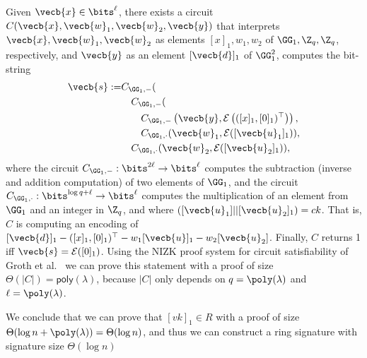 Given \(\vecb{x}\in\bits^\ell\), there exists a circuit \(C(\vecb{x},\vecb{w}_1,\vecb{w}_2,\vecb{y})\) that interprets \(\vecb{x},\vecb{w}_1,\vecb{w}_2\) as  elements \([x]_1,w_1,w_2\) of \(\GG_1,\Z_q,\Z_q\), respectively, and \(\vecb{y}\) as an element \([\vecb{d}]_1\) of \(\GG_1^2\), computes the bit-string
\begin{align*}
\vecb{s}:=
    &C_{\GG_1,-}(\\
        &\quad C_{\GG_1,-}(\\
            &\qquad C_{\GG_1,-}\left(
                \vecb{y},
                \mathcal{E}\left(
                        ({[x]_1},{[0]_1})^\top\right)\right),\\
            &\qquad C_{\GG_1,\cdot}(
                        \vecb{w}_1,
                        \mathcal{E}([\vecb{u}_1]_1)),\\
        &\quad C_{\GG_1,\cdot}(
                    \vecb{w}_2,
                    \mathcal{E}([\vecb{u}_2]_1)),
\end{align*}
where the circuit $C_{\GG_1,-}:\bits^{2\ell}\to\bits^\ell$ computes the subtraction (inverse and addition computation) of two elements of $\GG_1$, and the circuit $C_{\GG_1,\cdot}:\bits^{\log q+\ell}\to\bits^\ell$ computes the multiplication of an element from $\GG_1$ and an integer in $\Z_q$, and where \(([\vecb{u}_1]||[\vecb{u}_2]_1)=ck\). That is, $C$ is computing an encoding of $[\vecb{d}]_1-([x]_1,[0]_1)^\top-w_1[\vecb{u}]_1-w_2[\vecb{u}_2]$. Finally, $C$ returns 1 iff \(\vecb{s}=\mathcal{E}([0]_1)\). Using the NIZK proof system for circuit satisfiability of Groth et al.~\cite{EC:GroOstSah06} we can prove this statement with a proof of size \(\Theta(|C|)=\mathsf{poly}(\lambda)\), because \(|C|\) only depends on \(q=\poly(\lambda)\) and \(\ell=\poly(\lambda)\).

We conclude that we can prove that \([vk]_1\in R\) with a proof of size \(\Theta(\log n +\poly(\lambda))=\Theta(\log n)\), and thus we can construct a ring signature with signature size \(\Theta(\log n)\)
